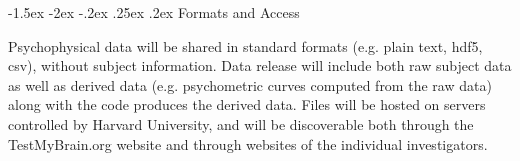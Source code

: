 \documentclass{nsfproposal}
\makeatletter
\renewcommand\section{\@startsection {section}{1}{\z@}%
                                   {-1.5ex \@plus -2ex \@minus -.2ex}%
                                   {.25ex \@plus.2ex}%
                                   {\normalfont\Large\bfseries}}
\theoremstyle{definition}
\makeatother
\begin{document}
\section{Formats and Access}

Psychophysical data will be shared in standard formats (e.g. plain text, hdf5, csv), without subject information. Data release will include both raw subject data as well as derived data (e.g. psychometric curves computed from the raw data) along with the code produces the derived data.
Files will be hosted on servers controlled by Harvard University, and will be discoverable both through the TestMyBrain.org website and through websites of the individual investigators.
\end{document}
